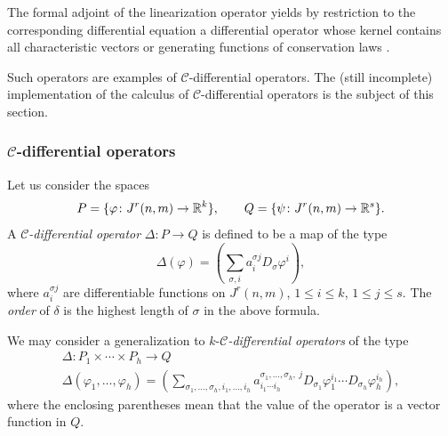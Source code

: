 The formal adjoint of the linearization operator yields by restriction to the
corresponding differential equation a differential operator whose kernel
contains all characteristic vectors or generating functions of conservation
laws \cite{Krasilshchik:99,Olver:93}.

Such operators are examples of $\mathcal{C}$-differential operators. The (still
incomplete) \REDUCE implementation of the calculus of
$\mathcal{C}$-differential operators is the subject of this section.

\subsubsection[C-differential operators]{$\mathcal{C}$-differential operators}
\label{cdesec:mathc-diff-oper}

Let us consider the spaces
\[
  P=\{\varphi\colon J^r(n,m)\to \mathbb{R}^k\},\qquad Q=\{\psi\colon J^r(n,m)\to \mathbb{R}^s\}.
\]
A \emph{$\mathcal{C}$-differential operator} $\Delta\colon P\to Q$ is defined
to be a map of the type
\begin{equation}\label{eq:4}
  \Delta(\varphi) = (\sum_{\sigma, i}a^{\sigma j}_i D_\sigma \varphi^i),
\end{equation}
where $a^{\sigma j}_i$ are differentiable functions on $J^r(n,m)$, $1\leq i\leq
k$, $1\leq j\leq s$. The \emph{order} of $\delta$ is the highest length of
$\sigma$ in the above formula.

We may consider a generalization to $k$-\emph{$\mathcal{C}$-differential
  operators} of the type
\begin{multline}\label{eq:7}
  \Delta\colon P_1\times\cdots\times P_h \to Q\\
  \Delta(\varphi_1,\dots,\varphi_h) =
  (\sum_{\sigma_1,\ldots,\sigma_h, i_1,\ldots,
    i_h}a^{\sigma_1,\ldots,\sigma_h,\ j}_{i_1\cdots i_h} D_{\sigma_1}
  \varphi_1^{i_1}\cdots D_{\sigma_h}\varphi_h^{i_h}),
\end{multline}
where the enclosing parentheses mean that the value of the operator is a vector
function in $Q$.

